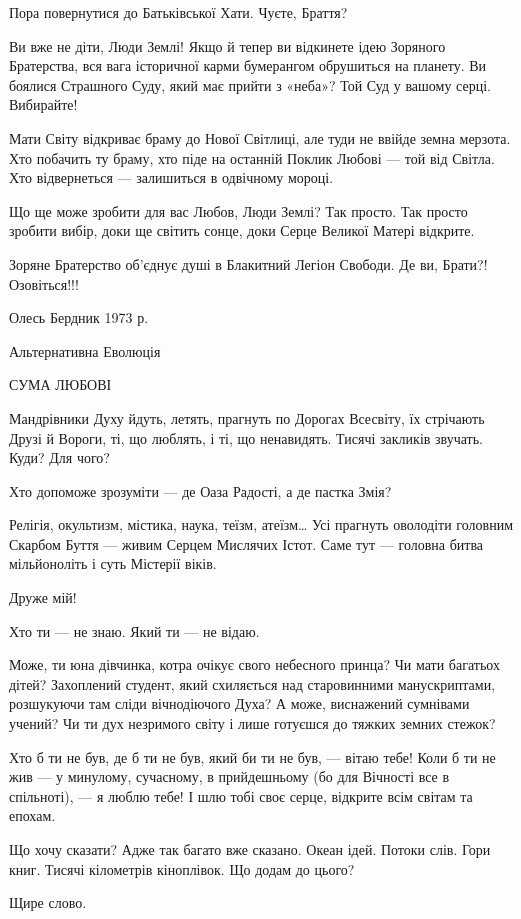Пора повернутися до Батьківської Хати. Чуєте, Браття?

Ви вже не діти, Люди Землі! Якщо й тепер ви відкинете ідею Зоряного Братерства,
вся вага історичної карми бумерангом обрушиться на планету. Ви боялися
Страшного Суду, який має прийти з «неба»? Той Суд у вашому серці. Вибирайте!

Мати Світу відкриває браму до Нової Світлиці, але туди не ввійде земна мерзота.
Хто побачить ту браму, хто піде на останній Поклик Любові — той від Світла. Хто
відвернеться — залишиться в одвічному мороці.

Що ще може зробити для вас Любов, Люди Землі? Так просто. Так просто зробити
вибір, доки ще світить сонце, доки Серце Великої Матері відкрите.

Зоряне Братерство об’єднує душі в Блакитний Легіон Свободи. Де ви, Брати?!
Озовіться!!!

Олесь Бердник 1973 р.

Альтернативна Еволюція

СУМА ЛЮБОВІ

Мандрівники Духу йдуть, летять, прагнуть по Дорогах Всесвіту, їх стрічають
Друзі й Вороги, ті, що люблять, і ті, що ненавидять. Тисячі закликів звучать.
Куди? Для чого?

Хто допоможе зрозуміти — де Оаза Радості, а де пастка Змія?

Релігія, окультизм, містика, наука, теїзм, атеїзм… Усі прагнуть оволодіти
головним Скарбом Буття — живим Серцем Мислячих Істот. Саме тут — головна битва
мільйоноліть і суть Містерії віків.

Друже мій!

Хто ти — не знаю. Який ти — не відаю.

Може, ти юна дівчинка, котра очікує свого небесного принца? Чи мати багатьох
дітей? Захоплений студент, який схиляється над старовинними манускриптами,
розшукуючи там сліди вічнодіючого Духа? А може, виснажений сумнівами учений? Чи
ти дух незримого світу і лише готуєшся до тяжких земних стежок?

Хто б ти не був, де б ти не був, який би ти не був, — вітаю тебе! Коли б ти не
жив — у минулому, сучасному, в прийдешньому (бо для Вічності все в спільноті),
— я люблю тебе! І шлю тобі своє серце, відкрите всім світам та епохам.

Що хочу сказати? Адже так багато вже сказано. Океан ідей. Потоки слів. Гори книг. Тисячі кілометрів кіноплівок. Що додам до цього?

Щире слово.

